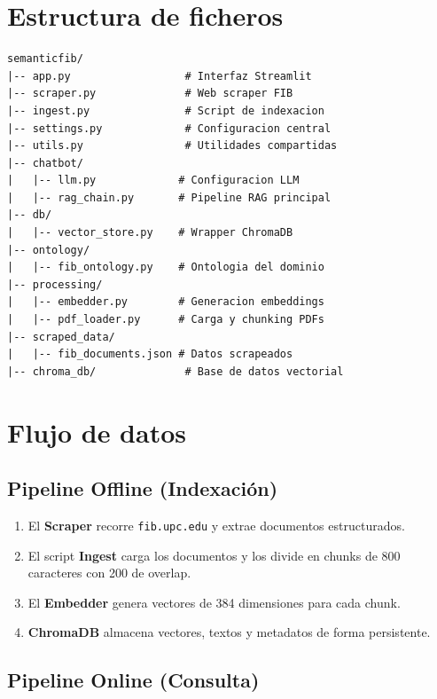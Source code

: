 \documentclass[12pt, a4paper, twoside]{report}
\begin{document}
\section{Estructura de ficheros}

\begin{lstlisting}[language={}, caption={Estructura del proyecto}, label={lst:structure}]
semanticfib/
|-- app.py                  # Interfaz Streamlit
|-- scraper.py              # Web scraper FIB
|-- ingest.py               # Script de indexacion
|-- settings.py             # Configuracion central
|-- utils.py                # Utilidades compartidas
|-- chatbot/
|   |-- llm.py             # Configuracion LLM
|   |-- rag_chain.py       # Pipeline RAG principal
|-- db/
|   |-- vector_store.py    # Wrapper ChromaDB
|-- ontology/
|   |-- fib_ontology.py    # Ontologia del dominio
|-- processing/
|   |-- embedder.py        # Generacion embeddings
|   |-- pdf_loader.py      # Carga y chunking PDFs
|-- scraped_data/
|   |-- fib_documents.json # Datos scrapeados
|-- chroma_db/              # Base de datos vectorial
\end{lstlisting}

\section{Flujo de datos}

\subsection{Pipeline Offline (Indexaci\'on)}

\begin{enumerate}
  \item El \textbf{Scraper} recorre \texttt{fib.upc.edu} y extrae documentos estructurados.
  \item El script \textbf{Ingest} carga los documentos y los divide en chunks de 800 caracteres con 200 de overlap.
  \item El \textbf{Embedder} genera vectores de 384 dimensiones para cada chunk.
  \item \textbf{ChromaDB} almacena vectores, textos y metadatos de forma persistente.
\end{enumerate}

\subsection{Pipeline Online (Consulta)}
\end{document}

